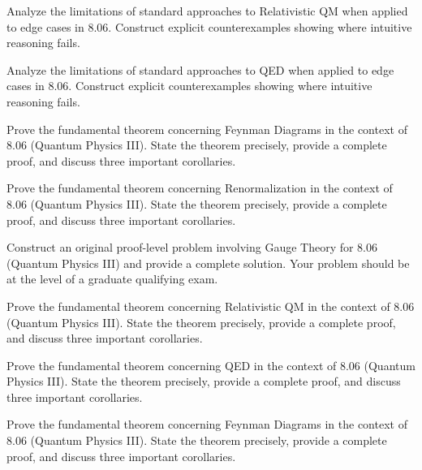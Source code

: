 \documentclass[12pt,a4paper]{exam}
\begin{document}
\begin{questions}

\question[3]
Analyze the limitations of standard approaches to Relativistic QM when applied to edge cases in 8.06. Construct explicit counterexamples showing where intuitive reasoning fails.

\vspace{0.3cm}

\question[7]
Analyze the limitations of standard approaches to QED when applied to edge cases in 8.06. Construct explicit counterexamples showing where intuitive reasoning fails.

\vspace{0.3cm}

\question[7]
Prove the fundamental theorem concerning Feynman Diagrams in the context of 8.06 (Quantum Physics III). State the theorem precisely, provide a complete proof, and discuss three important corollaries.

\vspace{0.3cm}

\question[4]
Prove the fundamental theorem concerning Renormalization in the context of 8.06 (Quantum Physics III). State the theorem precisely, provide a complete proof, and discuss three important corollaries.

\vspace{0.3cm}

\question[4]
Construct an original proof-level problem involving Gauge Theory for 8.06 (Quantum Physics III) and provide a complete solution. Your problem should be at the level of a graduate qualifying exam.

\vspace{0.3cm}

\question[5]
Prove the fundamental theorem concerning Relativistic QM in the context of 8.06 (Quantum Physics III). State the theorem precisely, provide a complete proof, and discuss three important corollaries.

\vspace{0.3cm}

\question[4]
Prove the fundamental theorem concerning QED in the context of 8.06 (Quantum Physics III). State the theorem precisely, provide a complete proof, and discuss three important corollaries.

\vspace{0.3cm}

\question[3]
Prove the fundamental theorem concerning Feynman Diagrams in the context of 8.06 (Quantum Physics III). State the theorem precisely, provide a complete proof, and discuss three important corollaries.


\end{questions}
\end{document}
